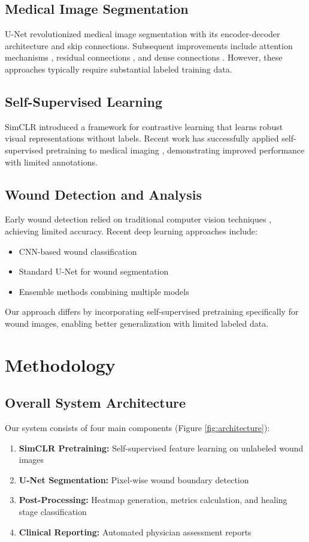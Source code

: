 \documentclass[conference]{IEEEtran}
\begin{document}
\subsection{Medical Image Segmentation}
U-Net \cite{ronneberger2015unet} revolutionized medical image segmentation with its encoder-decoder architecture and skip connections. Subsequent improvements include attention mechanisms \cite{attention_unet}, residual connections \cite{resnet_unet}, and dense connections \cite{dense_unet}. However, these approaches typically require substantial labeled training data.

\subsection{Self-Supervised Learning}
SimCLR \cite{chen2020simclr} introduced a framework for contrastive learning that learns robust visual representations without labels. Recent work has successfully applied self-supervised pretraining to medical imaging \cite{azizi2021ssl_med}, demonstrating improved performance with limited annotations.

\subsection{Wound Detection and Analysis}
Early wound detection relied on traditional computer vision techniques \cite{traditional_wound}, achieving limited accuracy. Recent deep learning approaches include:
\begin{itemize}
    \item CNN-based wound classification \cite{cnn_wound_class}
    \item Standard U-Net for wound segmentation \cite{unet_wound}
    \item Ensemble methods combining multiple models \cite{ensemble_wound}
\end{itemize}

Our approach differs by incorporating self-supervised pretraining specifically for wound images, enabling better generalization with limited labeled data.

\section{Methodology}

\subsection{Overall System Architecture}
Our system consists of four main components (Figure \ref{fig:architecture}):
\begin{enumerate}
    \item \textbf{SimCLR Pretraining:} Self-supervised feature learning on unlabeled wound images
    \item \textbf{U-Net Segmentation:} Pixel-wise wound boundary detection
    \item \textbf{Post-Processing:} Heatmap generation, metrics calculation, and healing stage classification
    \item \textbf{Clinical Reporting:} Automated physician assessment reports
\end{enumerate}
\end{document}
